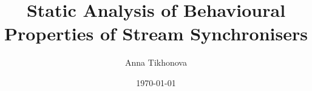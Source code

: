 \documentclass{report}
\begin{document}
\author{Anna Tikhonova}
\title{Static Analysis of Behavioural Properties of Stream Synchronisers}
\date{\today}
\maketitle
\tableofcontents








\end{document}
